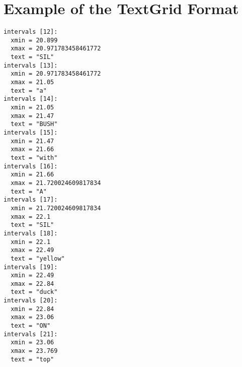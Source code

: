 \label{appendix:textgrid}
\chapter{Example of the TextGrid Format}

\begin{verbatim}
intervals [12]:
  xmin = 20.899 
  xmax = 20.971783458461772 
  text = "SIL" 
intervals [13]:
  xmin = 20.971783458461772 
  xmax = 21.05 
  text = "a" 
intervals [14]:
  xmin = 21.05 
  xmax = 21.47 
  text = "BUSH" 
intervals [15]:
  xmin = 21.47 
  xmax = 21.66 
  text = "with" 
intervals [16]:
  xmin = 21.66 
  xmax = 21.720024609817834 
  text = "A" 
intervals [17]:
  xmin = 21.720024609817834 
  xmax = 22.1 
  text = "SIL" 
intervals [18]:
  xmin = 22.1 
  xmax = 22.49 
  text = "yellow" 
intervals [19]:
  xmin = 22.49 
  xmax = 22.84 
  text = "duck" 
intervals [20]:
  xmin = 22.84 
  xmax = 23.06 
  text = "ON" 
intervals [21]:
  xmin = 23.06 
  xmax = 23.769 
  text = "top"
\end{verbatim}
